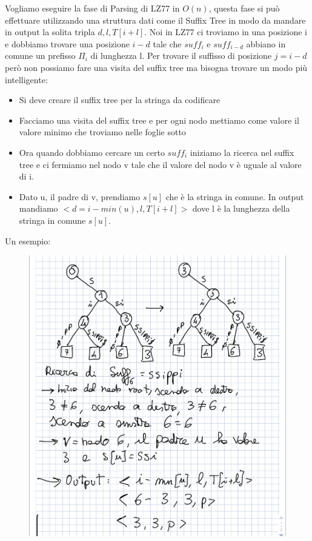 \documentclass[14pt]{extreport}
\begin{document}
Vogliamo eseguire la fase di Parsing di LZ77 in $O(n)$, questa fase si può effettuare utilizzando una struttura dati come il Suffix Tree in modo da mandare in output la solita tripla $d,l,T[i+l]$.
Noi in LZ77 ci troviamo in una posizione i e dobbiamo trovare una posizione $i-d$ tale che $suff_i$ e $suff_{i-d}$ abbiano in comune un prefisso $\Pi_i$ di lunghezza l.
Per trovare il suffisso di posizione $j=i-d$ però non possiamo fare una visita del suffix tree ma bisogna trovare un modo più intelligente:
\begin{itemize}
\item Si deve creare il suffix tree per la stringa da codificare
\item Facciamo una visita del suffix tree e per ogni nodo mettiamo come valore il valore minimo che troviamo nelle foglie sotto
\item Ora quando dobbiamo cercare un certo $suff_i$ iniziamo la ricerca nel suffix tree e ci fermiamo nel nodo v tale che il valore del nodo v è uguale al valore di i.
\item Dato u, il padre di v, prendiamo $s[u]$ che è la stringa in comune. In output mandiamo $<d=i-min(u), l, T[i+l]>$ dove l è la lunghezza della stringa in comune $s[u]$.
\end{itemize}

Un esempio:

\begin{figure}[H]
\centering
  \includegraphics[width=\linewidth]{IMG_0178.jpg}
\end{figure}
\end{document}
